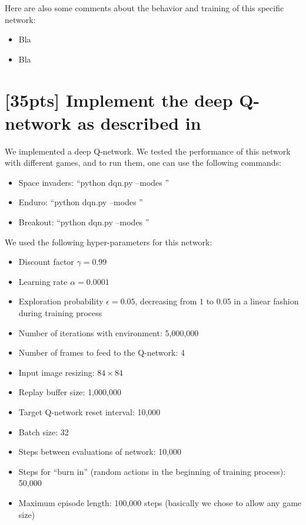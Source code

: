 \documentclass{article}
\begin{document}
Here are also some comments about the behavior and training of this specific network:

\begin{itemize}
  \item Bla
  \item Bla
\end{itemize}

\section{[35pts] Implement the deep Q-network as described in \cite{mnih2013playing,mnih2015human}}

We implemented a deep Q-network. We tested the performance of this network with different games, and to run them, one can use the following commands:
\begin{itemize}
  \item Space invaders: ``python dqn.py --modes ''
  \item Enduro: ``python dqn.py --modes ''
  \item Breakout: ``python dqn.py --modes ''
\end{itemize}

We used the following hyper-parameters for this network:
\begin{itemize}
  \item Discount factor $\gamma=0.99$
  \item Learning rate $\alpha=0.0001$
  \item Exploration probability $\epsilon=0.05$, decreasing from $1$ to $0.05$ in a linear fashion during training process
  \item Number of iterations with environment: 5,000,000
  \item Number of frames to feed to the Q-network: 4
  \item Input image resizing: $84\times84$
  \item Replay buffer size: 1,000,000
  \item Target Q-network reset interval: 10,000
  \item Batch size: 32
  \item Steps between evaluations of network: 10,000
  \item Steps for ``burn in'' (random actions in the beginning of training process): 50,000
  \item Maximum episode length: 100,000 steps (basically we chose to allow any game size)
\end{itemize}
\end{document}
